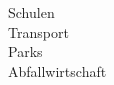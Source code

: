 \documentclass[preview]{standalone}
\begin{document}
Schulen\\Transport\\Parks\\Abfallwirtschaft\\
\end{document}
